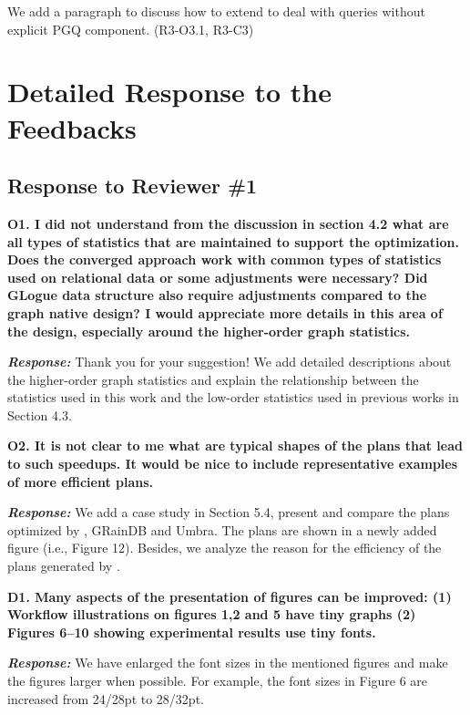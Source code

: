 We add a paragraph to discuss how to extend \name to deal with queries without explicit PGQ component. (R3-O3.1, R3-C3)


\section{Detailed Response to the Feedbacks}
\label{sec:response}
\subsection{Response to Reviewer \#1}

\textbf{O1. I did not understand from the discussion in section 4.2 what are all types of statistics that are maintained to support the optimization. Does the converged approach work with common types of statistics used on relational data or some adjustments were necessary? Did GLogue data structure also require adjustments compared to the graph native design? I would appreciate more details in this area of the design, especially around the higher-order graph statistics.}

\textbf{\textit{Response: }}
Thank you for your suggestion! We add detailed descriptions about the higher-order graph statistics and explain the relationship between the statistics used in this work and the low-order statistics used in previous works in Section 4.3.



\textbf{O2. It is not clear to me what are typical shapes of the plans that lead to such speedups. It would be nice to include representative examples of more efficient plans.}

\textbf{\textit{Response: }}
We add a case study in Section 5.4, present and compare the plans optimized by \name, GRainDB and Umbra.
The plans are shown in a newly added figure (i.e., Figure 12).
Besides, we analyze the reason for the efficiency of the plans generated by \name.


\textbf{D1. Many aspects of the presentation of figures can be improved:
(1) Workflow illustrations on figures 1,2 and 5 have tiny graphs
(2) Figures 6--10 showing experimental results use tiny fonts.}

\textbf{\textit{Response: }}
We have enlarged the font sizes in the mentioned figures and make the figures larger when possible.
For example, the font sizes in Figure 6 are increased from 24/28pt to 28/32pt.



